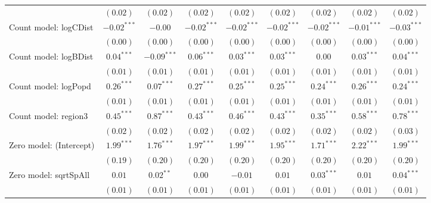 \begin{sidewaystable}
\begin{center}
{\begin{tabular}{l c c c c c c c c}
                               & $(0.02)$       & $(0.02)$      & $(0.02)$      & $(0.02)$      & $(0.02)$      & $(0.02)$      & $(0.02)$      & $(0.02)$      \\
Count model: logCDist          & $-0.02^{***}$  & $-0.00$       & $-0.02^{***}$ & $-0.02^{***}$ & $-0.02^{***}$ & $-0.02^{***}$ & $-0.01^{***}$ & $-0.03^{***}$ \\
                               & $(0.00)$       & $(0.00)$      & $(0.00)$      & $(0.00)$      & $(0.00)$      & $(0.00)$      & $(0.00)$      & $(0.00)$      \\
Count model: logBDist          & $0.04^{***}$   & $-0.09^{***}$ & $0.06^{***}$  & $0.03^{***}$  & $0.03^{***}$  & $0.00$        & $0.03^{***}$  & $0.04^{***}$  \\
                               & $(0.01)$       & $(0.01)$      & $(0.01)$      & $(0.01)$      & $(0.01)$      & $(0.01)$      & $(0.01)$      & $(0.01)$      \\
Count model: logPopd           & $0.26^{***}$   & $0.07^{***}$  & $0.27^{***}$  & $0.25^{***}$  & $0.25^{***}$  & $0.24^{***}$  & $0.26^{***}$  & $0.24^{***}$  \\
                               & $(0.01)$       & $(0.01)$      & $(0.01)$      & $(0.01)$      & $(0.01)$      & $(0.01)$      & $(0.01)$      & $(0.01)$      \\
Count model: region3           & $0.45^{***}$   & $0.87^{***}$  & $0.43^{***}$  & $0.46^{***}$  & $0.43^{***}$  & $0.35^{***}$  & $0.58^{***}$  & $0.78^{***}$  \\
                               & $(0.02)$       & $(0.02)$      & $(0.02)$      & $(0.02)$      & $(0.02)$      & $(0.02)$      & $(0.02)$      & $(0.03)$      \\
Zero model: (Intercept)        & $1.99^{***}$   & $1.76^{***}$  & $1.97^{***}$  & $1.99^{***}$  & $1.95^{***}$  & $1.71^{***}$  & $2.22^{***}$  & $1.99^{***}$  \\
                               & $(0.19)$       & $(0.20)$      & $(0.20)$      & $(0.20)$      & $(0.20)$      & $(0.20)$      & $(0.20)$      & $(0.20)$      \\
Zero model: sqrtSpAll          & $0.01$         & $0.02^{**}$   & $0.00$        & $-0.01$       & $0.01$        & $0.03^{***}$  & $0.01$        & $0.04^{***}$  \\
                               & $(0.01)$       & $(0.01)$      & $(0.01)$      & $(0.01)$      & $(0.01)$      & $(0.01)$      & $(0.01)$      & $(0.01)$      \\

\end{tabular}}
\end{center}
\end{sidewaystable}
